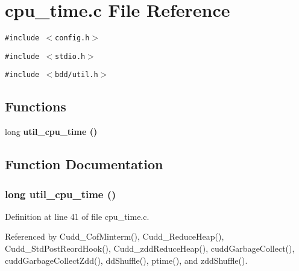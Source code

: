\section{cpu\_\-time.c File Reference}
\label{cpu__time_8c}
{\tt \#include $<$config.h$>$}\par
{\tt \#include $<$stdio.h$>$}\par
{\tt \#include $<$bdd/util.h$>$}\par
\subsection*{Functions}
\begin{CompactItemize}
\item 
long \bf{util\_\-cpu\_\-time} ()
\end{CompactItemize}


\subsection{Function Documentation}
\subsubsection{\setlength{\rightskip}{0pt plus 5cm}long util\_\-cpu\_\-time ()}\label{cpu__time_8c_3799d1a38c030f9e1100cb0ac20e39a2}




Definition at line 41 of file cpu\_\-time.c.

Referenced by Cudd\_\-Cof\-Minterm(), Cudd\_\-Reduce\-Heap(), Cudd\_\-Std\-Post\-Reord\-Hook(), Cudd\_\-zdd\-Reduce\-Heap(), cudd\-Garbage\-Collect(), cudd\-Garbage\-Collect\-Zdd(), dd\-Shuffle(), ptime(), and zdd\-Shuffle().